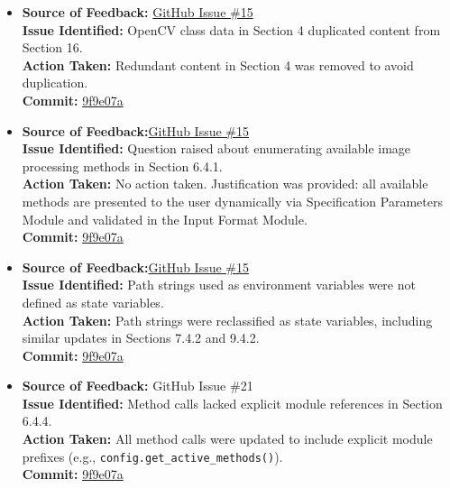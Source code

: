 \documentclass{article}
\begin{document}
\begin{itemize}

  \item \textbf{Source of Feedback:} \href{https://github.com/KiranSingh15/CAS-741-Image-Correspondences/issues/15}{GitHub Issue \#15} \\
  \textbf{Issue Identified:} OpenCV class data in Section 4 duplicated content from Section 16. \\
  \textbf{Action Taken:} Redundant content in Section 4 was removed to avoid duplication. \\
  \textbf{Commit:} \href{https://github.com/KiranSingh15/CAS-741-Image-Correspondences/commit/9f9e07a572e2f0db97f3e057f998ba9bad0d9189}{9f9e07a}

  \item \textbf{Source of Feedback:}\href{https://github.com/KiranSingh15/CAS-741-Image-Correspondences/issues/15}{GitHub Issue \#15} \\
  \textbf{Issue Identified:} Question raised about enumerating available image processing methods in Section 6.4.1. \\
  \textbf{Action Taken:} No action taken. Justification was provided: all available methods are presented to the user dynamically via Specification Parameters Module and validated in the Input Format Module. \\
  \textbf{Commit:} \href{https://github.com/KiranSingh15/CAS-741-Image-Correspondences/commit/9f9e07a572e2f0db97f3e057f998ba9bad0d9189}{9f9e07a}

  \item \textbf{Source of Feedback:}\href{https://github.com/KiranSingh15/CAS-741-Image-Correspondences/issues/15}{GitHub Issue \#15} \\
  \textbf{Issue Identified:} Path strings used as environment variables were not defined as state variables. \\
  \textbf{Action Taken:} Path strings were reclassified as state variables, including similar updates in Sections 7.4.2 and 9.4.2. \\
  \textbf{Commit:} \href{https://github.com/KiranSingh15/CAS-741-Image-Correspondences/commit/9f9e07a572e2f0db97f3e057f998ba9bad0d9189}{9f9e07a}

  \item \textbf{Source of Feedback:} GitHub Issue \#21 \\
  \textbf{Issue Identified:} Method calls lacked explicit module references in Section 6.4.4. \\
  \textbf{Action Taken:} All method calls were updated to include explicit module prefixes (e.g., \texttt{config.get\_active\_methods()}). \\
  \textbf{Commit:} \href{https://github.com/KiranSingh15/CAS-741-Image-Correspondences/commit/9f9e07a572e2f0db97f3e057f998ba9bad0d9189}{9f9e07a}


\end{itemize}
\end{document}
